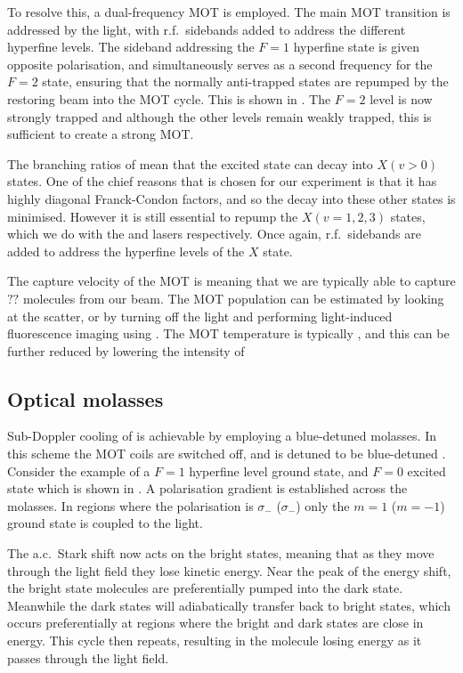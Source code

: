 To resolve this, a dual-frequency MOT is employed. The main MOT transition is
addressed by the  light, with r.f.\ sidebands added to address
the different hyperfine levels. The sideband addressing the $F=1$ hyperfine
state is given opposite polarisation, and simultaneously serves as a second
frequency for the $F=2$ state, ensuring that the normally anti-trapped states
are repumped by the restoring beam into the MOT cycle. This is shown in . The $F=2$ level is now strongly trapped and although the other levels
remain weakly trapped, this is sufficient to create a strong MOT.

The branching ratios of \CaF{} mean that the excited state can decay into
$X(v>0)$ states. One of the chief reasons that \CaF{} is chosen for our
experiment is that it has highly diagonal Franck-Condon factors, and so the
decay into these other states is minimised. However it is still essential to
repump the $X(v=1,2,3)$ states, which we do with the 
 and  lasers respectively. Once again, r.f.\
sidebands are added to address the hyperfine levels of the $X$ state.

The capture velocity of the MOT is  meaning that we are typically able
to capture $??$ molecules from our beam. The MOT population can be estimated by
looking at the scatter, or by turning off the light and performing
light-induced fluorescence imaging using . The MOT temperature is
typically \cm{}, and this can be further reduced by lowering the intensity of
\pewpew{C}{00}~\cite{Truppe2017} \cm{what is final temp?}

\subsection*{Optical molasses}

Sub-Doppler cooling of \CaF{} is achievable by employing a blue-detuned
molasses. In this scheme the MOT coils are switched off, and 
is detuned to be blue-detuned \cm{by how much?}.  Consider the example of a
$F=1$ hyperfine level ground state, and $F=0$ excited state which is shown in
\cm{fig like Hannah's 5.1}. A polarisation gradient is established across the
molasses. In regions where the polarisation is $\sigma_-$ ($\sigma_-$) only the
$m=1$ ($m=-1$) ground state is coupled to the light.

The a.c.\ Stark shift now acts on the bright states, meaning that as they move
through the light field they lose kinetic energy. Near the peak of the energy
shift, the bright state molecules are preferentially pumped into the dark
state. Meanwhile the dark states will adiabatically transfer back to bright
states, which occurs preferentially at regions where the bright and dark states
are close in energy. This cycle then repeats, resulting in the molecule losing
energy as it passes through the light field.

